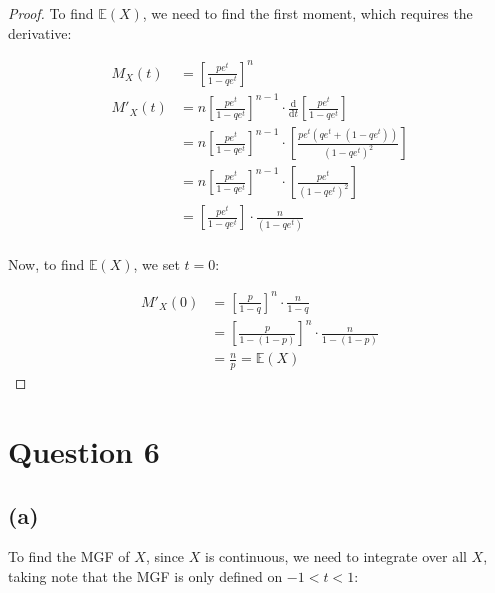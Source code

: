 \documentclass[12pt]{article}
\begin{document}
\begin{proof} 
    To find $ \mathbb{E}(X)$, we need to find the first moment, which requires the derivative:

    \begin{align*}
        M_X (t) &= \left[\frac{p e^{t}}{1- qe^{t}} \right] ^{n} \\ 
        M'_X (t) &= n \left[ \frac{p e^{t}}{1-qe^{t}}\right]^{n-1} \cdot  \frac{\text{d}}{\text{d}t} \left[ \frac{pe^{t}}{1-qe^{t}}\right] \\ 
        &= n \left[ \frac{p e^{t}}{1-qe^{t}}\right]^{n-1} \cdot \left[ \frac{pe^{t}(qe^{t} + (1-qe^{t}))}{(1-qe^{t})^{2}}\right] \\ 
        &= n \left[ \frac{p e^{t}}{1-qe^{t}}\right]^{n-1} \cdot \left[ \frac{pe^{t}}{(1-qe^{t})^{2}}\right] \\ 
        &= \left[ \frac{pe^{t}}{1-qe^{t}}\right] \cdot \frac{n}{(1-qe^{t})} \\
    \end{align*}

    \noindent Now, to find $\mathbb{E}(X)$, we set $t = 0$:

    \begin{align*}
        M'_X (0) &= \left[ \frac{p}{1-q}\right]^{n} \cdot \frac{n}{1-q} \\ 
        &= \left[ \frac{p}{1-(1-p)}\right]^{n} \cdot \frac{n}{1- (1-p)} \\ 
        &= \boxed{\frac{n}{p}} = \mathbb{E}(X)
    \end{align*}
\end{proof}


\section*{Question 6}
\subsection*{(a)}
To find the MGF of $X$, since $X$ is continuous, we need to integrate over all $X$, taking note that the MGF is only defined on $-1 <t<1$: 
\end{document}
